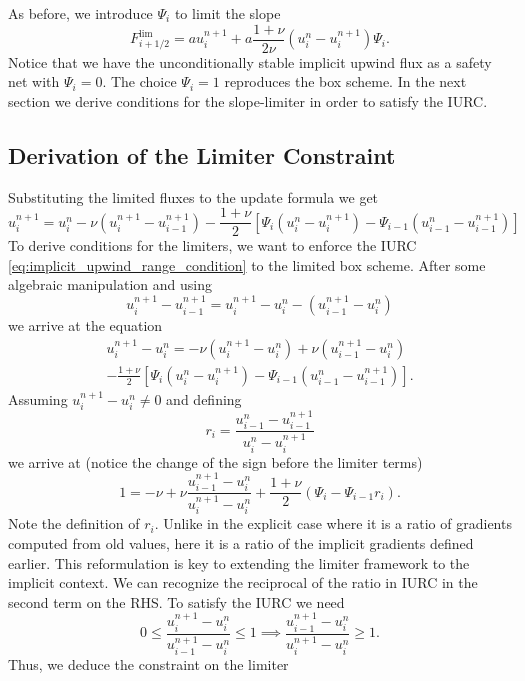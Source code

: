 As before, we introduce \(\Psi_i\) to limit the slope
\[
    F_{i+1/2}^{\text{lim}} = a u_{i}^{n+1} + a\frac{1+\nu}{2\nu}\left( u_{i}^{n}-u_{i}^{n+1} \right)\Psi_i.
\]
Notice that we have the unconditionally stable implicit upwind flux as a safety net with \(\Psi_i = 0\).
The choice \(\Psi_i = 1\) reproduces the box scheme.
In the next section we derive conditions for the slope-limiter in order to satisfy the IURC.

\subsection{Derivation of the Limiter Constraint}
\label{sec:implicit_limiter_derivation}

Substituting the limited fluxes to the update formula we get
\[
u_i^{n+1} = u_{i}^{n} -\nu(u_i^{n+1} - u_{i-1}^{n+1}) - \frac{1+\nu}{2} \left[ \Psi_i(u_i^n - u_i^{n+1}) - \Psi_{i-1}(u_{i-1}^n - u_{i-1}^{n+1}) \right]
\]
To derive conditions for the limiters, we want to enforce the IURC \eqref{eq:implicit_upwind_range_condition} to the limited box scheme.
After some algebraic manipulation and using
\[
    u_{i}^{n+1} - u_{i-1}^{n+1} = u_{i}^{n+1} - u_{i}^{n} - \left( u_{i-1}^{n+1} - u_{i}^{n} \right)
\]
we arrive at the equation
\begin{multline*}
    u_{i}^{n+1}-u_{i}^{n} =
    -\nu\left( u_{i}^{n+1}-u_{i}^{n} \right) + \nu \left( u_{i-1}^{n+1}-u_{i}^{n} \right)\\
    -\frac{1+\nu}{2}
    \left[ \Psi_i \left( u_{i}^{n}-u_{i}^{n+1} \right) - \Psi_{i-1} \left( u_{i-1}^{n}-u_{i-1}^{n+1} \right) \right].
\end{multline*}
Assuming \(u_{i}^{n+1} - u_{i}^{n} \neq 0\) and defining
\[
    r_i = \frac{u_{i-1}^{n}-u_{i-1}^{n+1}}{u_{i}^{n}-u_{i}^{n+1}}
\]
we arrive at (notice the change of the sign before the limiter terms)
\[
    1 = -\nu + \nu\frac{u_{i-1}^{n+1}-u_{i}^{n}}{u_{i}^{n+1}-u_{i}^{n}}
    +\frac{1+\nu}{2} \left( \Psi_i - \Psi_{i-1}r_i \right).
\]
Note the definition of \(r_i\).
Unlike in the explicit case where it is a ratio of gradients computed from old values, here it is a ratio of the implicit gradients defined earlier.
This reformulation is key to extending the limiter framework to the implicit context.
We can recognize the reciprocal of the ratio in IURC in the second term on the RHS.
To satisfy the IURC we need
\[
    0 \leq \frac{u_{i}^{n+1}-u_{i}^{n}}{u_{i-1}^{n+1}-u_{i}^{n}} \leq 1
    \implies \frac{u_{i-1}^{n+1}-u_{i}^{n}}{u_{i}^{n+1}-u_{i}^{n}} \geq 1.
\]
Thus, we deduce the constraint on the limiter
